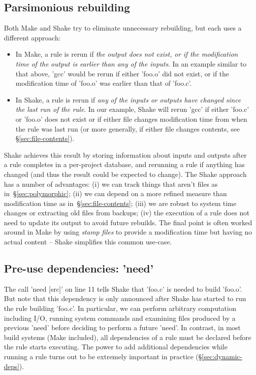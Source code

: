 \subsection{Parsimonious rebuilding}

Both Make and Shake try to eliminate unnecessary rebuilding, but each
uses a different approach:

\begin{itemize}
\item In Make, a rule is rerun if \emph{the output does not exist, or if the
modification time of the output is earlier than any of the inputs}. In an example
similar to that above, \lst'gcc' would be rerun if either \lst'foo.o' did not
exist, or if the modification time of \lst'foo.o' was earlier than that of
\lst'foo.c'.
\item In Shake, a rule is rerun if \emph{any of the inputs or outputs have changed since the
last run of the rule}. In our example, Shake will rerun \lst'gcc' if
either \lst'foo.c' or \lst'foo.o' does not exist or if either file
changes modification time from when the rule was last run (or more
generally, if either file changes contents, see
\S\ref{sec:file-contents}).
\end{itemize}
\noindent
Shake achieves this result by storing information about inputs and outputs after a rule
completes in a per-project database, and rerunning a rule if anything has
changed (and thus the result could be expected to change). The Shake approach
has a number of advantages: (i) we can track things that aren't files as
in~\S\ref{sec:polymorphic}; (ii) we can depend on a more refined measure than
modification time as in~\S\ref{sec:file-contents}; (iii) we are robust to system
time changes or extracting old files from backups; (iv) the execution of a rule
does not need to update its output to avoid future rebuilds. The final point is
often worked around in Make by using \emph{stamp files} to provide a
modification time but having no actual content -- Shake simplifies this common
use-case.

\subsection{Pre-use dependencies: \lst'need'\label{sec:need}}

The call \lst'need [src]' on line 11 tells Shake that \lst'foo.c' is needed
to build \lst'foo.o'. But note that this dependency is only announced
after Shake has started to run the rule building \lst'foo.c'.
In particular, we can perform
arbitrary computation including I/O, running system commands and examining files
produced by a previous \lst'need' before deciding to perform a future \lst'need'.
In contrast, in most build systems (Make included), all dependencies of a rule must be
declared before the rule starts executing. The power to add additional dependencies
while running a rule turns out to be extremely important in practice (\S\ref{sec:dynamic-deps}).

